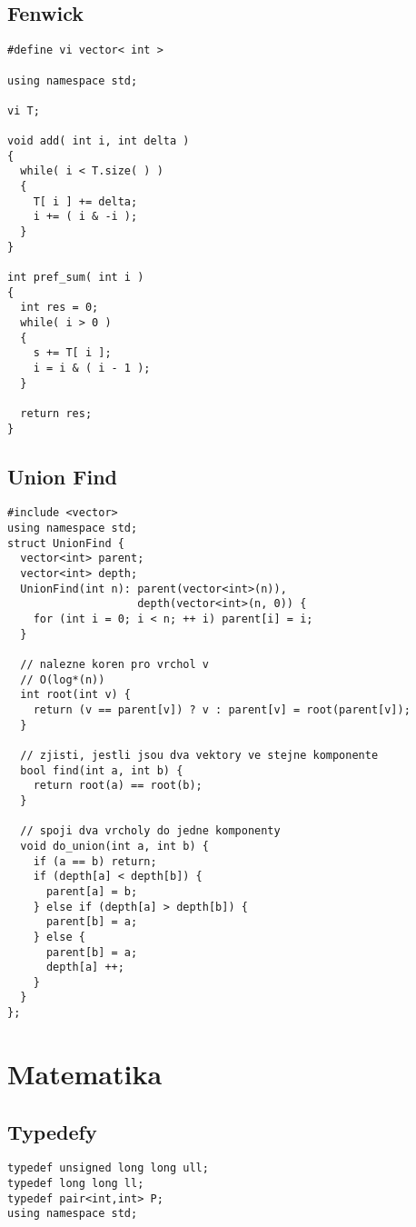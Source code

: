 \documentclass{article}
\begin{document}
\subsection{Fenwick}
\begin{lstlisting}
#define vi vector< int >

using namespace std;

vi T;

void add( int i, int delta )
{
  while( i < T.size( ) )
  {
    T[ i ] += delta;
    i += ( i & -i );
  }
}

int pref_sum( int i )
{
  int res = 0;
  while( i > 0 )
  {
    s += T[ i ];
    i = i & ( i - 1 );
  }

  return res;
}
\end{lstlisting}

\subsection{Union Find}
\begin{lstlisting}
#include <vector>
using namespace std;
struct UnionFind {
  vector<int> parent;
  vector<int> depth;
  UnionFind(int n): parent(vector<int>(n)), 
                    depth(vector<int>(n, 0)) {
    for (int i = 0; i < n; ++ i) parent[i] = i;
  }

  // nalezne koren pro vrchol v
  // O(log*(n))
  int root(int v) {
    return (v == parent[v]) ? v : parent[v] = root(parent[v]);
  }

  // zjisti, jestli jsou dva vektory ve stejne komponente
  bool find(int a, int b) {
    return root(a) == root(b);
  }

  // spoji dva vrcholy do jedne komponenty
  void do_union(int a, int b) {
    if (a == b) return;
    if (depth[a] < depth[b]) {
      parent[a] = b;
    } else if (depth[a] > depth[b]) {
      parent[b] = a;
    } else {
      parent[b] = a;
      depth[a] ++;
    }
  }
};
\end{lstlisting}

\newpage
\section{Matematika}

\subsection{Typedefy}
\begin{lstlisting}
typedef unsigned long long ull;
typedef long long ll;
typedef pair<int,int> P;
using namespace std;
\end{lstlisting}
\end{document}
